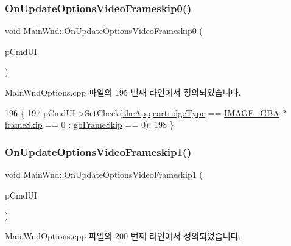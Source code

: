\subsubsection{\texorpdfstring{On\+Update\+Options\+Video\+Frameskip0()}{OnUpdateOptionsVideoFrameskip0()}}
{\footnotesize\ttfamily void Main\+Wnd\+::\+On\+Update\+Options\+Video\+Frameskip0 (\begin{DoxyParamCaption}\item[{C\+Cmd\+UI $\ast$}]{p\+Cmd\+UI }\end{DoxyParamCaption})\hspace{0.3cm}{\ttfamily [protected]}}



Main\+Wnd\+Options.\+cpp 파일의 195 번째 라인에서 정의되었습니다.


\begin{DoxyCode}
196 \{
197   pCmdUI->SetCheck(\mbox{\hyperlink{_v_b_a_8cpp_a8095a9d06b37a7efe3723f3218ad8fb3}{theApp}}.\mbox{\hyperlink{class_v_b_a_af300759fcbc7eeb00ce73f956fc5ddb7}{cartridgeType}} == \mbox{\hyperlink{_util_8h_aef8b88d56fdf9a25f990a68d80c014d8a25f0ac1f3a37d568346fedece32e4bfb}{IMAGE\_GBA}} ? 
      \mbox{\hyperlink{_globals_8cpp_a668e22999d7fcea3ed14130fd680b795}{frameSkip}} == 0 : \mbox{\hyperlink{_g_b_8cpp_a2139360d32d74969f470ef05414ecaf8}{gbFrameSkip}} == 0);  
198 \}
\end{DoxyCode}
\mbox{\label{class_main_wnd_a7f66c2de8b4946bd0c48b8124365cbfd}} 
\subsubsection{\texorpdfstring{On\+Update\+Options\+Video\+Frameskip1()}{OnUpdateOptionsVideoFrameskip1()}}
{\footnotesize\ttfamily void Main\+Wnd\+::\+On\+Update\+Options\+Video\+Frameskip1 (\begin{DoxyParamCaption}\item[{C\+Cmd\+UI $\ast$}]{p\+Cmd\+UI }\end{DoxyParamCaption})\hspace{0.3cm}{\ttfamily [protected]}}



Main\+Wnd\+Options.\+cpp 파일의 200 번째 라인에서 정의되었습니다.


